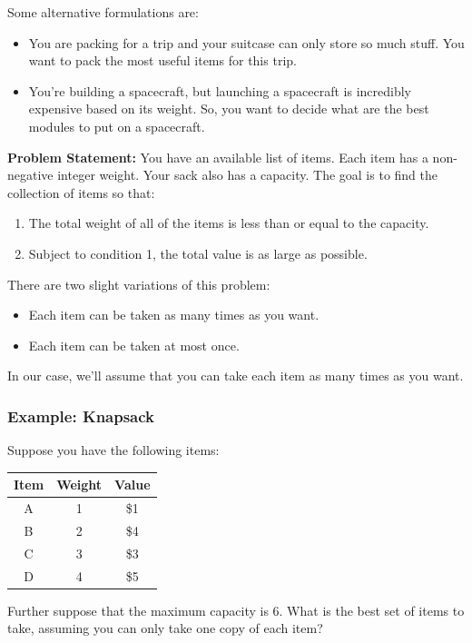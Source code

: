 \documentclass[letterpaper]{article}
\begin{document}
\bigskip 

Some alternative formulations are: 
\begin{itemize}
    \item You are packing for a trip and your suitcase can only store so much stuff. You want to pack the most useful items for this trip. 
    \item You're building a spacecraft, but launching a spacecraft is incredibly expensive based on its weight. So, you want to decide what are the best modules to put on a spacecraft. 
\end{itemize}

\textbf{Problem Statement:} You have an available list of items. Each item has a non-negative integer weight. Your sack also has a capacity. The goal is to find the collection of items so that:
\begin{enumerate}
    \item The total weight of all of the items is less than or equal to the capacity.
    \item Subject to condition 1, the total value is as large as possible. 
\end{enumerate}
There are two slight variations of this problem:
\begin{itemize}
    \item Each item can be taken as many times as you want. 
    \item Each item can be taken at most once. 
\end{itemize}
In our case, we'll assume that you can take each item as many times as you want. 

\subsubsection{Example: Knapsack}
Suppose you have the following items: 
\begin{center}
    \begin{tabular}{c|c|c}
        \textbf{Item} & \textbf{Weight} & \textbf{Value} \\ 
        \hline 
        A & 1 & \$1 \\ 
        B & 2 & \$4 \\ 
        C & 3 & \$3 \\ 
        D & 4 & \$5
    \end{tabular}
\end{center}
Further suppose that the maximum capacity is 6. What is the best set of items to take, assuming you can only take one copy of each item? 
\end{document}
